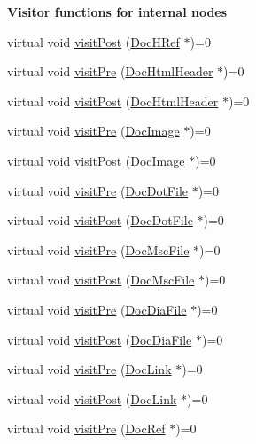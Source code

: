 \begin{Indent}{\bf Visitor functions for internal nodes}
\begin{DoxyCompactItemize}
virtual void \hyperlink{class_doc_visitor_ae8652f7fe31aa1f870b178326dbd4dfd}{visit\+Post} (\hyperlink{class_doc_h_ref}{Doc\+H\+Ref} $\ast$)=0
\item 
virtual void \hyperlink{class_doc_visitor_a7b89efb508cdf43eac73cab93a31e981}{visit\+Pre} (\hyperlink{class_doc_html_header}{Doc\+Html\+Header} $\ast$)=0
\item 
virtual void \hyperlink{class_doc_visitor_a2b5ea9275e789307ba60a9f140f4d24a}{visit\+Post} (\hyperlink{class_doc_html_header}{Doc\+Html\+Header} $\ast$)=0
\item 
virtual void \hyperlink{class_doc_visitor_a92215b3643f949cb8afa3c8a052696ba}{visit\+Pre} (\hyperlink{class_doc_image}{Doc\+Image} $\ast$)=0
\item 
virtual void \hyperlink{class_doc_visitor_aeb44708901d64a8399d2d4ae694b36fb}{visit\+Post} (\hyperlink{class_doc_image}{Doc\+Image} $\ast$)=0
\item 
virtual void \hyperlink{class_doc_visitor_aea8fe773544d038a30989c416d507ccf}{visit\+Pre} (\hyperlink{class_doc_dot_file}{Doc\+Dot\+File} $\ast$)=0
\item 
virtual void \hyperlink{class_doc_visitor_af6c25aa497869c540a03576f2bc69c6f}{visit\+Post} (\hyperlink{class_doc_dot_file}{Doc\+Dot\+File} $\ast$)=0
\item 
virtual void \hyperlink{class_doc_visitor_ab670b96996bca180a50ca0b8049afb74}{visit\+Pre} (\hyperlink{class_doc_msc_file}{Doc\+Msc\+File} $\ast$)=0
\item 
virtual void \hyperlink{class_doc_visitor_af0ee053f7a73bee4279dbb0ef904091b}{visit\+Post} (\hyperlink{class_doc_msc_file}{Doc\+Msc\+File} $\ast$)=0
\item 
virtual void \hyperlink{class_doc_visitor_a893bc2887cfc0a2b45347bc286eb9f36}{visit\+Pre} (\hyperlink{class_doc_dia_file}{Doc\+Dia\+File} $\ast$)=0
\item 
virtual void \hyperlink{class_doc_visitor_a06fa8cc6ea121c2397bebaccc0cc98da}{visit\+Post} (\hyperlink{class_doc_dia_file}{Doc\+Dia\+File} $\ast$)=0
\item 
virtual void \hyperlink{class_doc_visitor_a17ed8049abe49ff3fe15be4a3767492c}{visit\+Pre} (\hyperlink{class_doc_link}{Doc\+Link} $\ast$)=0
\item 
virtual void \hyperlink{class_doc_visitor_aa061673a2f6a5800460de7ee1939fd26}{visit\+Post} (\hyperlink{class_doc_link}{Doc\+Link} $\ast$)=0
\item 
virtual void \hyperlink{class_doc_visitor_a60cd2b69d01085d2390f5cd5353346e8}{visit\+Pre} (\hyperlink{class_doc_ref}{Doc\+Ref} $\ast$)=0

\end{DoxyCompactItemize}
\end{Indent}
